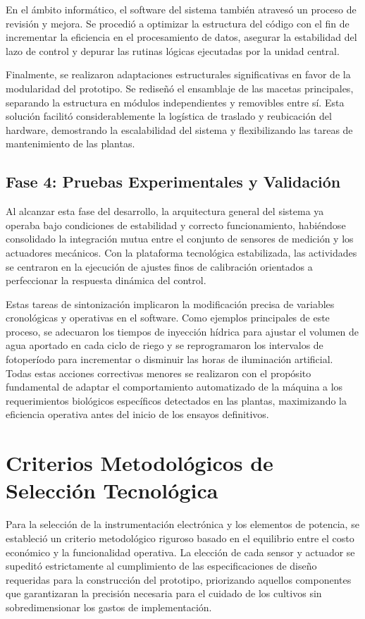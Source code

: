En el ámbito informático, el software del sistema también atravesó un proceso de revisión y mejora. Se procedió a optimizar la estructura del código con el fin de incrementar la eficiencia en el procesamiento de datos, asegurar la estabilidad del lazo de control y depurar las rutinas lógicas ejecutadas por la unidad central.

Finalmente, se realizaron adaptaciones estructurales significativas en favor de la modularidad del prototipo. Se rediseñó el ensamblaje de las macetas principales, separando la estructura en módulos independientes y removibles entre sí. Esta solución facilitó considerablemente la logística de traslado y reubicación del hardware, demostrando la escalabilidad del sistema y flexibilizando las tareas de mantenimiento de las plantas.

\subsection{Fase 4: Pruebas Experimentales y Validación}
Al alcanzar esta fase del desarrollo, la arquitectura general del sistema ya operaba bajo condiciones de estabilidad y correcto funcionamiento, habiéndose consolidado la integración mutua entre el conjunto de sensores de medición y los actuadores mecánicos. Con la plataforma tecnológica estabilizada, las actividades se centraron en la ejecución de ajustes finos de calibración orientados a perfeccionar la respuesta dinámica del control.

Estas tareas de sintonización implicaron la modificación precisa de variables cronológicas y operativas en el software. Como ejemplos principales de este proceso, se adecuaron los tiempos de inyección hídrica para ajustar el volumen de agua aportado en cada ciclo de riego y se reprogramaron los intervalos de fotoperíodo para incrementar o disminuir las horas de iluminación artificial. Todas estas acciones correctivas menores se realizaron con el propósito fundamental de adaptar el comportamiento automatizado de la máquina a los requerimientos biológicos específicos detectados en las plantas, maximizando la eficiencia operativa antes del inicio de los ensayos definitivos.%

\section{Criterios Metodológicos de Selección Tecnológica}
Para la selección de la instrumentación electrónica y los elementos de potencia, se estableció un criterio metodológico riguroso basado en el equilibrio entre el costo económico y la funcionalidad operativa. La elección de cada sensor y actuador se supeditó estrictamente al cumplimiento de las especificaciones de diseño requeridas para la construcción del prototipo, priorizando aquellos componentes que garantizaran la precisión necesaria para el cuidado de los cultivos sin sobredimensionar los gastos de implementación.

